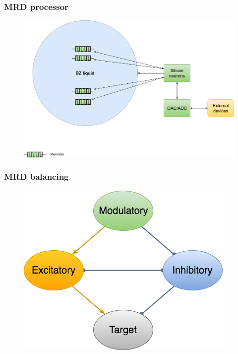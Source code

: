 \documentclass[12pt, aspectratio=169]{beamer}
\begin{document}
\begin{frame}
  \frametitle{MRD processor}
  
\begin{figure}
\includegraphics[width=0.8\linewidth]{MRD_silicon_neurons}
\end{figure}

\end{frame}


\begin{frame}
  \frametitle{MRD balancing}
  
\begin{figure}
\includegraphics[width=0.6\linewidth]{MRD_balancing}
\end{figure}

\end{frame}

\end{document}
